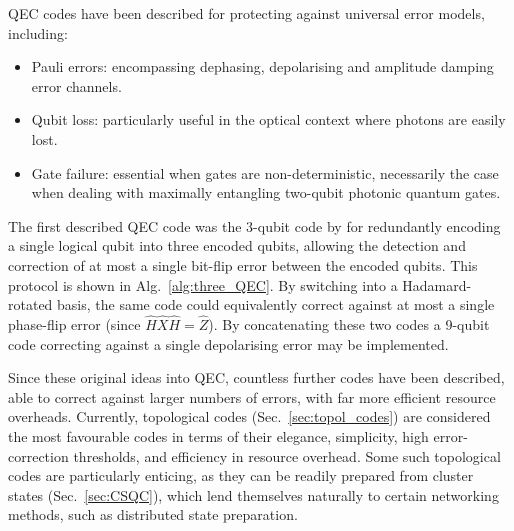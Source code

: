 \documentclass[aps, rmp, twocolumn, amsmath, amssymb, nofootinbib, superscriptaddress, longbibliography, floatfix, table-of-contents, eqsecnum]{revtex4-1}
\newcommand{\comment}[1]{{\color{blue}{\textbf{#1}}}}
\begin{document}
QEC codes have been described for protecting against universal error models, including:
\begin{itemize}
\item Pauli errors: encompassing dephasing, depolarising and amplitude damping \comment{Is A.D a Pauli channel?} error channels.
\item Qubit loss: particularly useful in the optical context where photons are easily lost.
\item Gate failure: essential when gates are non-deterministic, necessarily the case when dealing with maximally entangling two-qubit photonic quantum gates.
\end{itemize}

The first described QEC code was the 3-qubit code by \cite{bib:Shor95} for redundantly encoding a single logical qubit into three encoded qubits, allowing the detection and correction of at most a single bit-flip error between the encoded qubits. This protocol is shown in Alg.~\ref{alg:three_QEC}. By switching into a Hadamard-rotated basis, the same code could equivalently correct against at most a single phase-flip error (since \mbox{$\hat{H}\hat{X}\hat{H}=\hat{Z}$}). By concatenating these two codes a 9-qubit code correcting against a single depolarising error may be implemented.

Since these original ideas into QEC, countless further codes have been described, able to correct against larger numbers of errors, with far more efficient resource overheads. Currently, topological codes (Sec.~\ref{sec:topol_codes}) are considered the most favourable codes in terms of their elegance, simplicity, high error-correction thresholds, and efficiency in resource overhead. Some such topological codes are particularly enticing, as they can be readily prepared from cluster states (Sec.~\ref{sec:CSQC}), which lend themselves naturally to certain networking methods, such as distributed state preparation.
\end{document}

